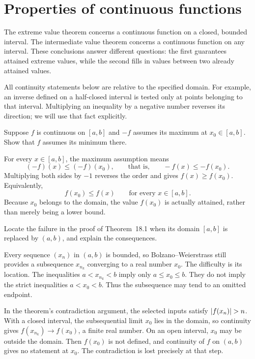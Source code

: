 \section{Properties of continuous functions}
\label{sec:properties-continuous}
The extreme value theorem concerns a continuous function on a closed,
bounded interval. The intermediate value theorem concerns a continuous
function on any interval. These conclusions answer different questions:
the first guarantees attained extreme values, while the second fills in
values between two already attained values.

All continuity statements below are relative to the specified domain.
For example, an inverse defined on a half-closed interval is tested only
at points belonging to that interval. Multiplying an inequality by a
negative number reverses its direction; we will use that fact explicitly.

\goal Suppose $f$ is continuous on $[a,b]$ and $-f$ assumes its
maximum at $x_0\in[a,b]$. Show that $f$ assumes its minimum there.

For every $x\in[a,b]$, the maximum assumption means
\[
 (-f)(x)\le(-f)(x_0),\qquad\text{that is,}\qquad
 -f(x)\le-f(x_0).
\]
Multiplying both sides by $-1$ reverses the order and gives
$f(x)\ge f(x_0)$. Equivalently,
\[
 f(x_0)\le f(x)\qquad\text{for every }x\in[a,b].
\]
Because $x_0$ belongs to the domain, the value $f(x_0)$ is
actually attained, rather than merely being a lower bound.

\goal Locate the failure in the proof of Theorem~18.1 when its
domain $[a,b]$ is replaced by $(a,b)$, and explain the consequences.

Every sequence $(x_n)$ in $(a,b)$ is bounded, so
Bolzano--Weierstrass still provides a subsequence $x_{n_k}$
converging to a real number $x_0$. The difficulty is its location.
The inequalities $a<x_{n_k}<b$ imply only $a\le x_0\le b$.
They do not imply the strict inequalities $a<x_0<b$.
Thus the subsequence may tend to an omitted endpoint.

In the theorem's contradiction argument, the selected inputs satisfy
$\abs{f(x_n)}>n$. With a closed interval, the subsequential limit
$x_0$ lies in the domain, so continuity gives
$f(x_{n_k})\to f(x_0)$, a finite real number. On an open interval,
$x_0$ may be outside the domain. Then $f(x_0)$ is not defined, and
continuity of $f$ on $(a,b)$ gives no statement at $x_0$.
The contradiction is lost precisely at that step.

